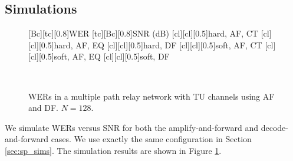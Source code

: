 \documentclass[journal]{IEEEtran}
\begin{document}
\subsection{Simulations}

\begin{figure}
    [Bc][tc][0.8]{WER}
    [tc][Bc][0.8]{SNR (dB)}
    [cl][cl][0.5]{hard, AF, CT}
    [cl][cl][0.5]{hard, AF, EQ}
    [cl][cl][0.5]{hard, DF}
    [cl][cl][0.5]{soft, AF, CT}
    [cl][cl][0.5]{soft, AF, EQ}
    [cl][cl][0.5]{soft, DF}

\centerline{
     \\
} \caption{WERs in a multiple path relay network
with TU channels using AF and DF.  $N = 128$.}
\label{fig:plots_mp}
\end{figure}

We simulate WERs versus SNR for both the amplify-and-forward and decode-and-forward cases.  We use exactly the same configuration in Section \ref{sec:sp_sims}.  The simulation results are shown in Figure \ref{fig:plots_mp}.
\end{document}

